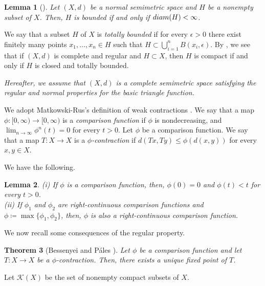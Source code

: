 \documentclass[10pt,a4paper]{amsart}
\newtheorem{Thm}{Theorem}[section]
\newtheorem{Lem}[Thm]{Lemma}
\begin{document}
\begin{Lem}[{\cite[Proposition 3]{BessenyeiPenzes2022}}]\label{lem:bounded-basic}
Let $(X,d)$ be a normal semimetric space and $H$ be a nonempty subset of $X$. 
Then, $H$ is bounded if and only if $\textup{diam}(H) < \infty$. 
\end{Lem}

We say that a subset $H$ of $X$ is {\it totally bounded} if for every $\epsilon > 0$ there exist finitely many points $x_1, \dots, x_n \in H$ such that $H \subset \bigcup_{i=1}^{n} B(x_i, \epsilon)$. 
By \cite[Lemma 2]{BessenyeiPenzes2022}, 
we see that if $(X,d)$ is complete and regular and $H \subset X$, then $H$ is compact if and only if $H$ is closed and totally bounded. 

{\it Hereafter, we assume that $(X,d)$ is a complete semimetric space satisfying the regular and normal properties for the basic triangle function.}  



We adopt Matkowski-Rus's definition of weak contractions \cite{Matkowski1975,Rus2001}.  
We say that a map $\phi : [0,\infty) \to [0,\infty)$ is a {\it comparison function} if 
$\phi$ is nondecreasing, and 
$\lim_{n \to \infty} \phi^n (t) = 0$ for every $t > 0$. 
Let $\phi$ be a comparison function. 
We say that a map $T : X \to X$ is a {\it $\phi$-contraction} if 
$d(Tx, Ty) \le \phi(d(x,y))$ for every $x, y \in X$. 



We have the following. 
\begin{Lem}\label{lem:comparison-basic}
(i) If $\phi$ is a comparison function, then, $\phi(0) = 0$ and  $\phi(t) < t$ for every $t > 0$. \\
(ii) If $\phi_1$ and $\phi_2$ are right-continuous comparison functions and $\phi \coloneqq \max\{\phi_1, \phi_2\}$, then, $\phi$ is also a right-continuous comparison function. 
\end{Lem}

We now recall some consequences of the regular property. 

\begin{Thm}[Bessenyei and P\'ales {\cite[Theorem 1]{BessenyeiPales2017}} ]\label{thm:Bessenyei-Pales-FP} 
Let $\phi$ be a comparison function and let $T : X \to X$ be a $\phi$-contraction. 
Then, there exists a unique fixed point of $T$. 
\end{Thm}

Let $\mathcal{K}(X)$ be the set of nonempty compact subsets of $X$. 
\end{document}
